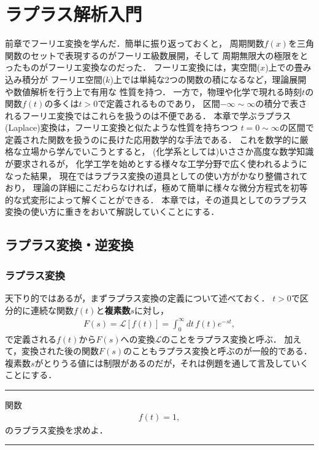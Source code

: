 \setcounter{chapter}{2}
\chapter{ラプラス解析入門}
%
前章でフーリエ変換を学んだ．簡単に振り返っておくと，
周期関数$f(x)$を三角関数のセットで表現するのがフーリエ級数展開，そして
周期無限大の極限をとったものがフーリエ変換なのだった．
%
フーリエ変換には，実空間($x$)上での畳み込み積分が
フーリエ空間($k$)上では単純な2つの関数の積になるなど，理論展開や数値解析を行う上で有用な
性質を持つ．
一方で，物理や化学で現れる時刻$t$の関数$f(t)$の多くは$t>0$で定義されるものであり，
区間$-\infty \sim \infty$の積分で表されるフーリエ変換ではこれらを扱うのは不便である．
本章で学ぶラプラス(Laplace)変換は，フーリエ変換と似たような性質を持ちつつ
$t=0\sim \infty$の区間で定義された関数を扱うのに長けた応用数学的な手法である．
これを数学的に厳格な立場から学んでいこうとすると，
(化学系としては)いささか高度な数学知識が要求されるが，
化学工学を始めとする様々な工学分野で広く使われるようになった結果，
現在ではラプラス変換の道具としての使い方がかなり整備されており，
理論の詳細にこだわらなければ，極めて簡単に様々な微分方程式を初等的な式変形によって解くことができる．
本章では，その道具としてのラプラス変換の使い方に重きをおいて解説していくことにする．
%
\section{ラプラス変換・逆変換}
%
\subsection{ラプラス変換}
%
天下り的ではあるが，まずラプラス変換の定義について述べておく．
$t>0$で区分的に連続な関数$f(t)$と\textbf{複素数}$s$に対し，
\begin{align}
 F(s) = \mathcal{L}\left[f\left(t\right)\right] = \int_{0}^{\infty}dt\,f\left(t\right)e^{-st},
\end{align}
で定義される$f(t)$から$F(s)$への変換$\mathcal{L}$のことをラプラス変換と呼ぶ．
加えて，変換された後の関数$F(s)$のこともラプラス変換と呼ぶのが一般的である．
複素数$s$がとりうる値には制限があるのだが，それは例題を通して言及していくことにする．
%
\newpage
%
\hrule
\reidai
関数
\begin{align}
  f(t) = 1,
\end{align}
のラプラス変換を求めよ．
\vspace*{.2cm}
\hrule
\vspace*{.2cm}

